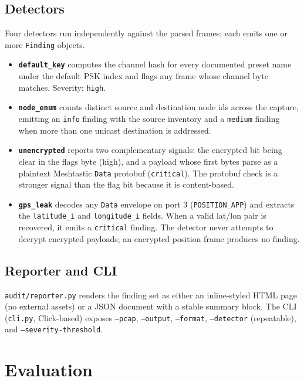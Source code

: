\documentclass[conference,a4paper,10pt]{IEEEtran}
\begin{document}
\subsection{Detectors}

Four detectors run independently against the parsed frames; each
emits one or more \texttt{Finding} objects.

\begin{itemize}
  \item \textbf{\texttt{default\_key}} computes the channel hash for
    every documented preset name under the default PSK index and
    flags any frame whose channel byte matches. Severity:
    \texttt{high}.
  \item \textbf{\texttt{node\_enum}} counts distinct source and
    destination node ids across the capture, emitting an \texttt{info}
    finding with the source inventory and a \texttt{medium} finding
    when more than one unicast destination is addressed.
  \item \textbf{\texttt{unencrypted}} reports two complementary
    signals: the encrypted bit being clear in the flags byte (high),
    and a payload whose first bytes parse as a plaintext Meshtastic
    \texttt{Data} protobuf (\texttt{critical}). The protobuf check is
    a stronger signal than the flag bit because it is content-based.
  \item \textbf{\texttt{gps\_leak}} decodes any \texttt{Data}
    envelope on port 3 (\texttt{POSITION\_APP}) and extracts the
    \texttt{latitude\_i} and \texttt{longitude\_i} fields. When a
    valid lat/lon pair is recovered, it emits a \texttt{critical}
    finding. The detector never attempts to decrypt encrypted
    payloads; an encrypted position frame produces no finding.
\end{itemize}

\subsection{Reporter and CLI}

\texttt{audit/reporter.py} renders the finding set as either an
inline-styled HTML page (no external assets) or a JSON document with
a stable summary block. The CLI (\texttt{cli.py}, Click-based)
exposes \texttt{--pcap}, \texttt{--output}, \texttt{--format},
\texttt{--detector} (repeatable), and \texttt{--severity-threshold}.

\section{Evaluation}
\end{document}
